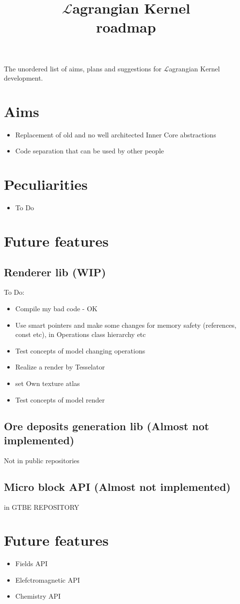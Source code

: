 \documentclass[12pt]{article}
\title{$\mathcal{L}$agrangian Kernel \\ roadmap}
\begin{document}
	\maketitle

	The unordered list of aims, plans and suggestions for $\mathcal{L}$agrangian Kernel development.

	\section{Aims}
	\begin{itemize}
		\item Replacement of old and no well architected Inner Core abstractions 
		\item Code separation that can be used by other people
	\end{itemize}

	\section{Peculiarities}

	\begin{itemize}
		\item To Do
	\end{itemize}

	\section{Future features}

	\subsection{Renderer lib (WIP)}
	To Do:

	\begin{itemize}
		\item Compile my bad code - OK
		\item Use smart pointers and make some changes for memory safety (references, const etc), in Operations class hierarchy etc
		\item Test concepts of model changing operations
		\item Realize a render by Tesselator
		\item set Own texture atlas
		\item Test concepts of model render
	\end{itemize}
	
	\subsection{Ore deposits generation lib (Almost not implemented)} 
	
	Not in public repositories

	\subsection{Micro block API (Almost not implemented)} 
	
	in GTBE REPOSITORY

	\section{Future features}

	\begin{itemize}
		\item Fields API
		\item Elefctromagnetic API
		\item Chemistry API
	\end{itemize}
\end{document}
